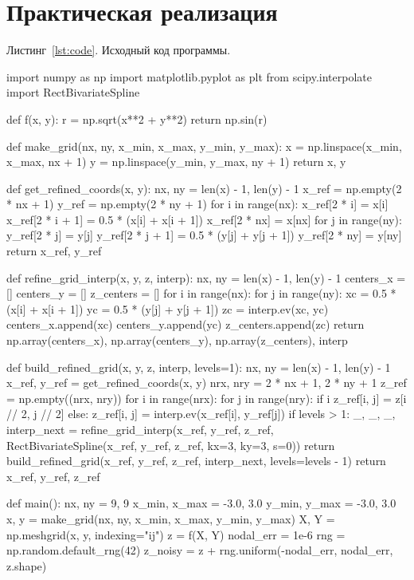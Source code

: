 \documentclass[a4paper, 14pt]{extarticle}
\begin{document}
\section{Практическая реализация}

\label{lst:code}
\noindent Листинг~\ref{lst:code}. Исходный код программы.

\begin{breakablelisting}
import numpy as np
import matplotlib.pyplot as plt
from scipy.interpolate import RectBivariateSpline


def f(x, y):
    r = np.sqrt(x**2 + y**2)
    return np.sin(r)


def make_grid(nx, ny, x_min, x_max, y_min, y_max):
    x = np.linspace(x_min, x_max, nx + 1)
    y = np.linspace(y_min, y_max, ny + 1)
    return x, y


def get_refined_coords(x, y):
    nx, ny = len(x) - 1, len(y) - 1
    x_ref = np.empty(2 * nx + 1)
    y_ref = np.empty(2 * ny + 1)
    for i in range(nx):
        x_ref[2 * i] = x[i]
        x_ref[2 * i + 1] = 0.5 * (x[i] + x[i + 1])
    x_ref[2 * nx] = x[nx]
    for j in range(ny):
        y_ref[2 * j] = y[j]
        y_ref[2 * j + 1] = 0.5 * (y[j] + y[j + 1])
    y_ref[2 * ny] = y[ny]
    return x_ref, y_ref


def refine_grid_interp(x, y, z, interp):
    nx, ny = len(x) - 1, len(y) - 1
    centers_x = []
    centers_y = []
    z_centers = []
    for i in range(nx):
        for j in range(ny):
            xc = 0.5 * (x[i] + x[i + 1])
            yc = 0.5 * (y[j] + y[j + 1])
            zc = interp.ev(xc, yc)
            centers_x.append(xc)
            centers_y.append(yc)
            z_centers.append(zc)
    return np.array(centers_x), np.array(centers_y), np.array(z_centers), interp


def build_refined_grid(x, y, z, interp, levels=1):
    nx, ny = len(x) - 1, len(y) - 1
    x_ref, y_ref = get_refined_coords(x, y)
    nrx, nry = 2 * nx + 1, 2 * ny + 1
    z_ref = np.empty((nrx, nry))
    for i in range(nrx):
        for j in range(nry):
            if i %
                z_ref[i, j] = z[i // 2, j // 2]
            else:
                z_ref[i, j] = interp.ev(x_ref[i], y_ref[j])
    if levels > 1:
        _, _, _, interp_next = refine_grid_interp(x_ref, y_ref, z_ref, RectBivariateSpline(x_ref, y_ref, z_ref, kx=3, ky=3, s=0))
        return build_refined_grid(x_ref, y_ref, z_ref, interp_next, levels=levels - 1)
    return x_ref, y_ref, z_ref


def main():
    nx, ny = 9, 9
    x_min, x_max = -3.0, 3.0
    y_min, y_max = -3.0, 3.0
    x, y = make_grid(nx, ny, x_min, x_max, y_min, y_max)
    X, Y = np.meshgrid(x, y, indexing="ij")
    z = f(X, Y)
    nodal_err = 1e-6
    rng = np.random.default_rng(42)
    z_noisy = z + rng.uniform(-nodal_err, nodal_err, z.shape)


\end{breakablelisting}
\end{document}
